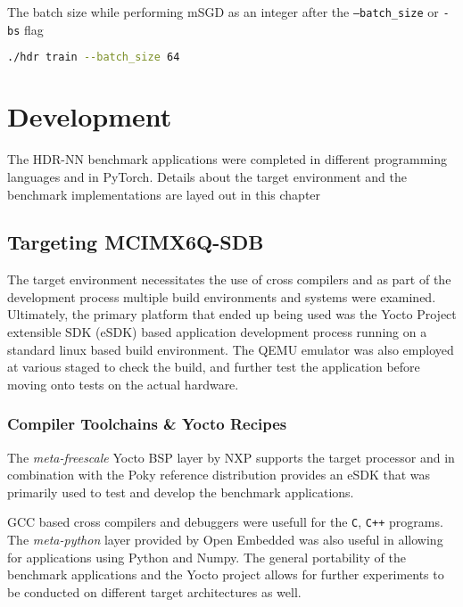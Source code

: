 The batch size while performing mSGD as an integer after the \texttt{--batch\_size} or \texttt{-bs} flag

\begin{lstlisting}[language=Bash]
	./hdr train --batch_size 64
\end{lstlisting}



\chapter{Development}

The HDR-NN benchmark applications were completed in different programming languages and in PyTorch. Details about the target environment and the benchmark implementations are layed out in this chapter

\section{Targeting MCIMX6Q-SDB}

The target environment necessitates the use of cross compilers and as part of the development process multiple build environments and systems were examined. Ultimately, the primary platform that ended up being used was the Yocto Project extensible SDK (eSDK) based application development process running on a standard linux based build environment. The QEMU emulator was also employed at various staged to check the build, and further test the application before moving onto tests on the actual hardware.

\subsection{Compiler Toolchains \& Yocto Recipes}

The \textit{meta-freescale} Yocto BSP layer by NXP supports the target processor and in combination with the Poky reference distribution provides an eSDK that was primarily used to test and develop the benchmark applications.

GCC based cross compilers and debuggers were usefull for the \texttt{C}, \texttt{C++}  programs. The \textit{meta-python} layer provided by Open Embedded was also useful in allowing for applications using Python and Numpy. The general portability of the benchmark applications and the Yocto project allows for further experiments to be conducted on different target architectures as well.

